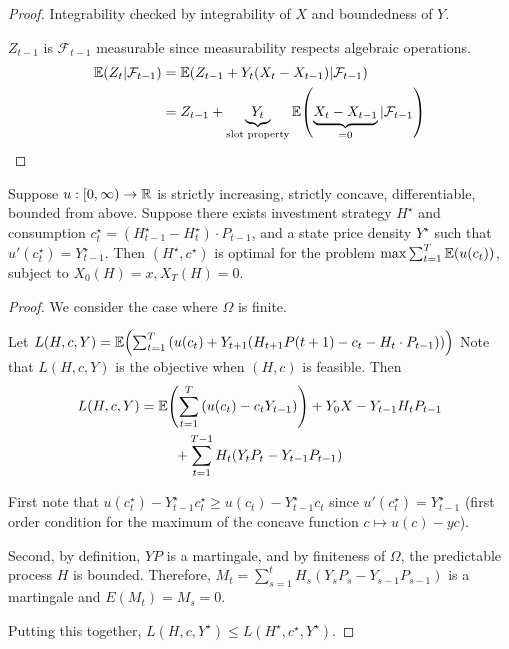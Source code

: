 \begin{proof}
  Integrability checked by integrability of $X$ and boundedness of
  $Y$.

  $Z_{t-1}$ is $\mathcal{F}_{t-1}$ measurable since measurability
  respects algebraic operations.
  \begin{align*}
    \E{Z_{t} | \mathcal{F}_{t-1}} & = \E{Z_{t-1} + Y_{t}(X_{t} -
      X_{t-1}) | \mathcal{F}_{t-1}} \\
                                  & = Z_{t-1} + \underbrace{Y_{t}}_{\text{slot property}} \E{\underbrace{X_{t} - X_{t-1}}_{=0} | \mathcal{F}_{t-1}}
  \end{align*}
\end{proof}

\begin{thm}
  \label{defn:discrete_time_models:9}
  Suppose $u: [0, \infty) \rightarrow \mathbb{R}$ is strictly increasing,
  strictly concave, differentiable, bounded from above.  Suppose there
  exists investment strategy $H^{\star}$ and consumption
  $c^{\star}_{t}= (H^{\star}_{t-1} - H^{\star}_{t}) \cdot P_{t-1}$,
  and a state price density $Y^{\star}$ such that $u'(c^{\star}_{t}) =
  Y^{\star}_{t-1}$.  Then $(H^{\star}, c^{\star})$ is optimal for the
  problem $\max \sum_{t=1}^{T} \E{u(c_{t})}$, subject to $X_{0}(H) =
  x, X_{T}(H) = 0$.
\end{thm}

\begin{proof}
  We consider the case where $\Omega$ is finite.

  Let $L(H, c, Y) = \E{\sum_{t=1}^{T} \left( u(c_{t}) +
      Y_{t+1}(H_{t+1} P(t+1)
      - c_{t} - H_{t} \cdot P_{t-1}) \right)}$
  Note that $L(H, c, Y)$ is the objective when $(H, c)$ is feasible.
  Then
  \begin{multline}
    L(H, c, Y) = \E{\sum_{t=1}^{T} \left(u(c_{t}) - c_{t}
        Y_{t-1}\right)} +  Y_{0} X - Y_{t-1} H_{t} P_{t-1} \\
    + \sum_{t=1}^{T-1} H_{t}(Y_{t} P_{t} - Y_{t-1} P_{t-1})
  \end{multline}

  First note that $u(c^{\star}_{t}) - Y^{\star}_{t-1} c^{\star}_{t}
  \geq u(c_{t}) - Y^{\star}_{t-1} c_{t}$ since $u'(c^{\star}_{t}) =
  Y^{\star}_{t-1}$ (first order condition for the maximum of the
  concave function $c \mapsto u(c) - yc$).

  Second, by definition, $YP$ is a martingale, and by finiteness of
  $\Omega$, the predictable process $H$ is bounded. Therefore, $M_{t}
  = \sum_{s=1}^{t} H_{s}(Y_{s} P_{s} - Y_{s-1} P_{s-1})$ is a
  martingale and $E(M_{t}) = M_{s} = 0$.

  Putting this together, $L(H, c, Y^{\star}) \leq L(H^{\star},
  c^{\star}, Y^{\star})$.
\end{proof}

